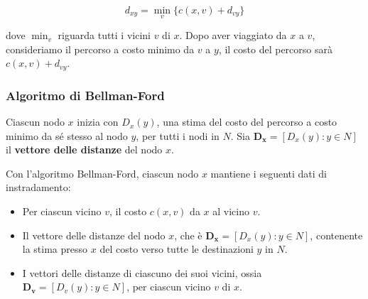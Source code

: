 \[
d_{xy} = \min_v \{c(x,v) + d_{vy}\}
\]

dove $\min_v$ riguarda tutti i vicini $v$ di $x$. Dopo aver viaggiato da $x$ a $v$, consideriamo il percorso a costo minimo da $v$ a $y$, il costo del percorso sarà $c(x,v) + d_{vy}$.

\subsubsection*{Algoritmo di Bellman-Ford}
Ciascun nodo $x$ inizia con $D_x(y)$, una stima del costo del percorso a costo minimo da sé stesso al nodo $y$, per tutti i nodi in $N$. Sia $\mathbf{D_x} = [D_x(y): y \in N]$ il \textbf{vettore delle distanze} del nodo $x$.

Con l'algoritmo Bellman-Ford, ciascun nodo $x$ mantiene i seguenti dati di instradamento:
\begin{itemize}
  \item Per ciascun vicino $v$, il costo $c(x,v)$ da $x$ al vicino $v$.
  \item Il vettore delle distanze del nodo $x$, che è $\mathbf{D_x} = [D_x(y): y \in N]$, contenente la stima presso $x$ del costo verso tutte le destinazioni $y$ in $N$.
  \item I vettori delle distanze di ciascuno dei suoi vicini, ossia $\mathbf{D_v} = [D_v(y): y \in N]$, per ciascun vicino $v$ di $x$.
\end{itemize}


